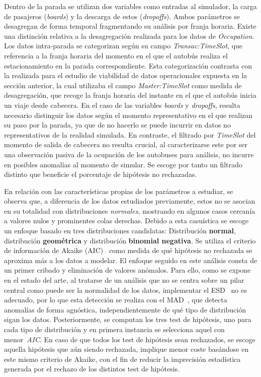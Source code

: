 Dentro de la parada se utilizan dos variables como entradas al simulador, la carga de pasajeros (\textit{boards}) y la 
descarga de estos (\textit{dropoffs}). Ambos parámetros se desagregan de forma temporal fragmentando su análisis por franja horaria.
Existe una distinción relativa a la desagregación realizada para los datos de \textit{Occupation}. Los datos intra-parada se
categorizan según su campo \textit{Transac:TimeSlot}, que referencia a la franja horaria del momento en el que el autobús realiza
el estacionamiento en la parada correspondiente. Esta categorización contrasta con la realizada para el estudio de viabilidad
de datos operacionales expuesta en la sección anterior, la cual utilizaba el campo \textit{Master:TimeSlot} como medida de 
desagregación, que recoge la franja horaria del instante en el que el autobús inicia un viaje desde cabecera. En el caso de las 
variables \textit{boards} y \textit{dropoffs}, resulta necesario distinguir los datos según el momento representativo en el que
realizan su paso por la parada, ya que de no hacerlo se puede incurrir en datos no representativos de la realidad simulada. En 
contraste, el filtrado por \textit{TimeSlot} del momento de salida de cabecera no resulta crucial, al caracterizarse este
por ser una observación pasiva de la ocupación de los autobuses para análisis, no incurre en posibles anomalías al momento
de simular. Se escoge por tanto un filtrado distinto que beneficie el porcentaje de hipótesis no rechazadas.

En relación con las características propias de los parámetros a estudiar, se observa que, a diferencia de los datos estudiados 
previamente, estos no se asocian en su totalidad con distribuciones \textit{normales}, mostrando en algunos casos
cercanía a valores nulos
y prominentes colas derechas. Debido a esta casuística se escoge un enfoque basado en tres distribuciones candidatas:
Distribución \textbf{normal}, distribución \textbf{geométrica} y distribución \textbf{binomial negativa}.
Se utiliza el criterio de información de Akaike (AIC)~\cite{akaike1974new} como medida de qué hipótesis no rechazada se 
aproxima más a los datos a modelar.
El enfoque seguido en este análisis consta de un primer cribado y eliminación de valores anómalos. Para ello, como se expone
en el estado del arte, al tratarse de un análisis que no se centra sobre un pilar central como puede ser la normalidad de los 
datos, implementar el ESD~\cite{rosner1983} no es adecuado, por lo que esta detección se realiza con el 
MAD~\cite{leys2013detecting}, que detecta anomalías de forma agnóstica, independientemente de qué tipo de distribución sigan 
los datos.
Posteriormente, se computan los tres test de hipótesis, uno para cada tipo de distribución y en primera instancia se
selecciona aquel con menor~\textit{AIC}. En caso de que todos los test de hipótesis sean rechazados, se escoge aquella
hipótesis que aún siendo rechazada, implique menor coste basándose en este mismo criterio de Akaike, con el fin de reducir 
la imprecisión estadística generada por el rechazo de los distintos test de hipótesis.

